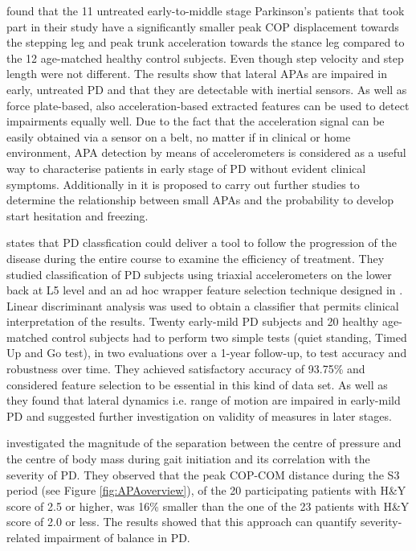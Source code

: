 \citeauthor{mancini_anticipatory_2009} \cite{mancini_anticipatory_2009} found that the 11 untreated early-to-middle stage Parkinson's patients that took part in their study have a significantly smaller peak COP displacement towards the stepping leg and peak trunk acceleration towards the stance leg compared to the 12 age-matched healthy control subjects. Even though step velocity and step length were not different. The results show that lateral APAs are impaired in early, untreated PD and that they are detectable with inertial sensors. As well as force plate-based, also acceleration-based extracted features can be used to detect impairments equally well. Due to the fact that the acceleration signal can be easily obtained via a sensor on a belt, no matter if in clinical or home environment, APA detection by means of accelerometers is considered as a useful way to characterise patients in early stage of PD without evident clinical symptoms. Additionally in \cite{mancini_anticipatory_2009} it is proposed to carry out further studies to determine the relationship between small APAs and the probability to develop start hesitation and freezing.

\citeauthor{palmerini_classification_2013} \cite{palmerini_classification_2013} states that PD classfication could deliver a tool to follow the progression of the disease during the entire course to examine the efficiency of treatment. They studied classification of PD subjects  using triaxial accelerometers on the lower back at L5 level and an ad hoc wrapper feature selection technique designed in \cite{palmerini_quantification_2013}. Linear discriminant analysis was used to obtain a classifier that permits clinical interpretation of the results. Twenty early-mild PD subjects and 20 healthy age-matched control subjects had to perform two simple tests (quiet standing, Timed Up and Go test), in two evaluations over a 1-year follow-up, to test accuracy and robustness over time. They achieved satisfactory accuracy of 93.75\% and considered feature selection to be essential in this kind of data set. As well as \cite{mancini_anticipatory_2009} they found that lateral dynamics i.e. range of motion are impaired in early-mild PD and suggested further investigation on validity of measures in later stages.

\citeauthor{hass_gait_2005-1} \cite{hass_gait_2005-1} investigated the magnitude of the separation between the centre of pressure and the centre of body mass during gait initiation and its correlation with the severity of PD. They observed that the peak COP-COM distance during the S3 period (see Figure \ref{fig:APAoverview}), of the 20 participating patients with H\&Y score of 2.5 or higher, was 16\% smaller than the one of the 23 patients with H\&Y score of 2.0 or less. The results showed that this approach can quantify severity-related impairment of balance in PD.

